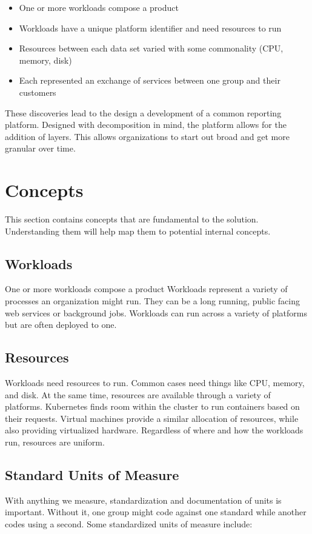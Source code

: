 \documentclass[10pt, a4paper, twocolumn]{article}
\begin{document}
  \begin{itemize}
    \item One or more workloads compose a product
    \item Workloads have a unique platform identifier and need resources to run
    \item Resources between each data set varied with some commonality (CPU, memory, disk)
    \item Each represented an exchange of services between one group and their customers
  \end{itemize}

  These discoveries lead to the design a development of a common reporting platform.
  Designed with decomposition in mind, the platform allows for the addition of layers.
  This allows organizations to start out broad and get more granular over time.


\section*{Concepts}
  This section contains concepts that are fundamental to the solution.
  Understanding them will help map them to potential internal concepts.

  \subsection*{Workloads}
    One or more workloads compose a product
    Workloads represent a variety of processes an organization might run.
    They can be a long running, public facing web services or background jobs.
    Workloads can run across a variety of platforms but are often deployed to one.

  \subsection*{Resources}
    Workloads need resources to run.
    Common cases need things like CPU, memory, and disk.
    At the same time, resources are available through a variety of platforms.
    Kubernetes finds room within the cluster to run containers based on their requests.
    Virtual machines provide a similar allocation of resources, while also providing virtualized hardware.
    Regardless of where and how the workloads run, resources are uniform.

  \subsection*{Standard Units of Measure}
    With anything we measure, standardization and documentation of units is important.
    Without it, one group might code against one standard while another codes using a second.
    Some standardized units of measure include:
\end{document}
